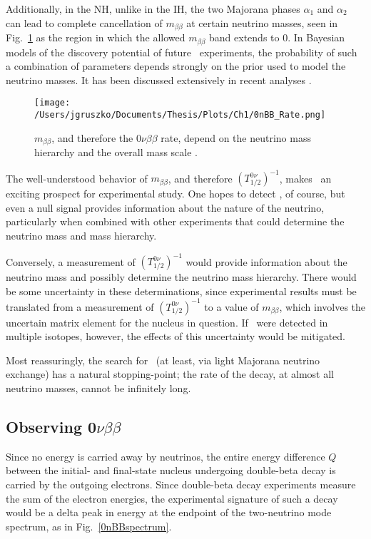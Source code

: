 Additionally, in the NH, unlike in the IH, the two Majorana phases $\alpha_1$ and $\alpha_2$ can lead to complete cancellation of $m_{\beta\beta}$ at certain neutrino masses, seen in Fig.~\ref{0nBBrate} as the region in which the allowed $m_{\beta\beta}$ band extends to 0. In Bayesian models of the discovery potential of future \nonubb\ experiments, the probability of such a combination of parameters depends strongly on the prior used to model the neutrino masses. It has been discussed extensively in recent analyses \cite{Agostini2017} \cite{Caldwell2017}. 
 
  \begin{figure}[h]
 \centering
 \texttt{[image: /Users/jgruszko/Documents/Thesis/Plots/Ch1/0nBB\_Rate.png]}
  \caption[$m_{\beta\beta}$ dependence on the neutrino mass and hierarchy]{$m_{\beta\beta}$, and therefore the $0\nu\beta\beta$ rate, depend on the neutrino mass hierarchy and the overall mass scale \cite{ZuberINT2015} .}
  \label{0nBBrate}
  \end{figure}   
  
The well-understood behavior of $m_{\beta\beta}$, and therefore $(T_{1/2}^{0\nu})^{-1}$, makes \nonubb\ an exciting prospect for experimental study. One hopes to detect \nonubb, of course, but even a null signal provides information about the nature of the neutrino, particularly when combined with other experiments that could determine the neutrino mass and mass hierarchy. 

Conversely, a measurement of $(T_{1/2}^{0\nu})^{-1}$ would provide information about the neutrino mass and possibly determine the neutrino mass hierarchy. There would be some uncertainty in these determinations, since experimental results must be translated from a measurement of $(T_{1/2}^{0\nu})^{-1}$ to a value of $m_{\beta\beta}$, which involves the uncertain matrix element for the nucleus in question. If \nonubb\ were detected in multiple isotopes, however, the effects of this uncertainty would be mitigated. 

Most reassuringly, the search for \nonubb\ (at least, via light Majorana neutrino exchange) has a natural stopping-point; the rate of the decay, at almost all neutrino masses, cannot be infinitely long. 

\subsection{Observing 0$\nu\beta\beta$}
Since no energy is carried away by neutrinos, the entire energy difference $Q$ between the initial- and final-state nucleus undergoing double-beta decay is carried by the outgoing electrons. Since double-beta decay experiments measure the sum of the electron energies, the experimental signature of such a decay would be a delta peak in energy at the endpoint of the two-neutrino mode spectrum, as in Fig.~\ref{0nBBspectrum}.

